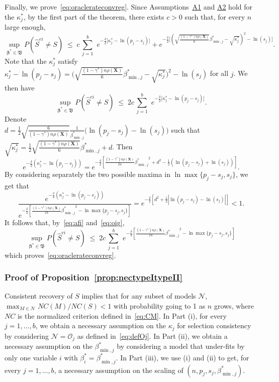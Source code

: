 \documentclass[
  12pt]{article}
\newcommand{\OO}{\mathcal{O}}
\newcommand{\bbeta}{\boldsymbol{\beta}}
\newcommand{\bX}{\mathbf{X}}
\newcommand{\bB}{\mathfrak{B}}
\begin{document}
Finally, we prove~\eqref{eq:oraclerateconvreg}. Since Assumptions~\hyperlink{lab:A1}{A1} and \hyperlink{lab:A2}{A2} hold for the $\kappa^*_j$, by the first part of the theorem, there exists $c>0$ such that, for every $n$ large enough,
\begin{equation*}
 \sup_{\bbeta^*\in \bB} P(\hat{S}^{ei} \neq S)\;\leq\; c\,\sum_{j=1}^b\,\, e^{-\tfrac{\delta}{2}\big[\kappa_j^*-\ln(p_j-s_j)\big]} + 
    e^{-\tfrac{\delta}{2}\big[(\sqrt{\frac{(1-\gamma^*) n\rho(\bX)}{6}}{\beta_{\min,j}^*} - \sqrt{\kappa_j^*})^2 -\ln(s_j) \big]}.
\end{equation*}
Note that the $\kappa_j^*$ satisfy $\kappa^*_j-\ln(p_j-s_j)=\big(\sqrt{\frac{(1-\gamma^*) n\rho(\bX)}{6}}{\beta_{\min,j}^*} - \sqrt{\kappa_j^*}\big)^2 -\ln(s_j)$ for all $j$. We then have
\begin{equation}\label{eq:afi}
 \sup_{\bbeta^*\in \bB}P(\hat{S}^{ei} \neq S)\;\leq\; 2c\,\sum_{j=1}^b\,\, e^{-\tfrac{\delta}{2}\big[\kappa_j^*-\ln(p_j-s_j)\big]}.
\end{equation}
Denote \\$d =\frac12\sqrt{\frac{6}{(1-\gamma^*) n\rho(\bX)}}\frac{1}{\beta_{\min,j}^*}\big(\ln({p_j-s_j})-\ln({s_j})\big)$ such that $\sqrt{\kappa^*_j}=  \frac12\sqrt{\frac{(1-\gamma^*) n\rho(\bX)}{6}}{\beta_{\min,j}^*} + d$. Then
$$e^{-\frac{\delta}{2}\left(\kappa^*_j-\ln(p_j-s_j)\right)}
=e^{-\frac{\delta}{2}\left[\frac{(1-\gamma^*) n\rho(\bX)}{24}{\beta_{\min,j}^*}^2+d^2 - \frac{1}{2}\left(\ln (p_j- s_j)+\ln (s_j)\right)\right]}.$$
By considering separately the two possible maxima in $\ln \max\{p_j-s_j,s_j\}$, we get that
\begin{equation}\label{eq:oig}
    \frac{e^{-\frac{\delta}{2}\left(\kappa^*_j-\ln(p_j-s_j)\right)}}{e^{-\frac{\delta}{2}\left[\frac{(1-\gamma^*) n\rho(\bX)}{24}{\beta_{\min,j}^*}^2-\ln \max\{p_j-s_j,s_j\}\right]}}= 
e^{-\frac{\delta}{2}\left[d^2 + \frac{1}{2}\left|\ln (p_j- s_j)-\ln (s_j)\right|\right]} <1.
\end{equation}
It follows that, by~\eqref{eq:afi} and~\eqref{eq:oig},
$$\sup_{\bbeta^*\in \bB} P(\hat{S}^{ei} \neq S) \; \leq \; 2c\,\sum_{j=1}^b\,\, e^{-\frac{\delta}{2}\left[\frac{(1-\gamma^*) n\rho(\bX)}{24}{\beta_{\min,j}^*}^2-\ln \max\{p_j-s_j,s_j\}\right]}$$
which proves~\eqref{eq:oraclerateconvreg}.

\subsubsection{Proof of Proposition~\ref{prop:nectypeItypeII}}
Consistent recovery of $S$ implies that for any subset of models $\mathcal{N}$, $\max_{M\in \mathcal{N}}NC(M)/NC(S)<1$ with probability going to 1 as $n$ grows, where $NC$ is the normalized criterion defined in~\eqref{eq:CM}. 
In Part (i), for every $j=1,\ldots,b$, we obtain a necessary assumption on the $\kappa_j$ for selection consistency by considering $\mathcal{N}=\OO_j$ as defined in~\eqref{eq:defOj}. In Part (ii), we obtain a necessary assumption on the $\beta_{\min,j}^*$ by considering a model that under-fits by only one variable $i$ with $\beta^*_i=\beta_{\min,j}^*$. In Part (iii), we use (i) and (ii) to get, for every $j=1,\ldots,b$, a necessary assumption on the scaling of $(n,p_j,s_j,\beta_{\min,j}^*)$.
\end{document}
